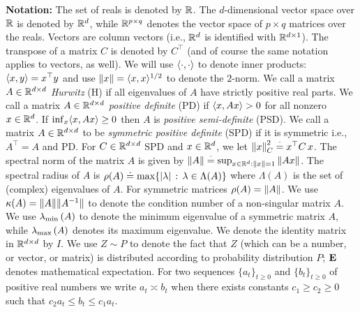 \textbf{Notation:} The set of reals is denoted by $\mathbb{R}$. 
The $d$-dimensional vector space over $\mathbb{R}$ is denoted by $\mathbb{R}^{d}$,
while $\mathbb{R}^{p\times q}$ denotes the vector space of $p\times q$ matrices over the reals.
Vectors are column vectors (i.e., $\mathbb{R}^d$ is identified with $\mathbb{R}^{d\times 1}$).
The transpose of a matrix $C$ is denoted by $C^\top$
(and of course the same notation applies to vectors, as well). 
We will use $\langle\cdot,\cdot\rangle$ to denote inner products: $\langle x,y\rangle=x^\top y$
and use $\left\| x\right\| = \langle x,x\rangle^{1/2}$ to denote the $2$-norm.
We call a matrix $A\in \mathbb{R}^{d \times d}$  \emph{Hurwitz} (H) if all eigenvalues of $A$ have strictly positive real parts. 
We call a matrix $A\in \mathbb{R}^{d \times d}$ \emph{positive definite} (PD) if $\langle x,Ax\rangle >0$ for all nonzero $x \in \mathbb{R}^{d}$.
If $\inf_x \langle x,Ax\rangle\ge 0$ then $A$ is \emph{positive semi-definite} (PSD).
We call a matrix $A\in \mathbb{R}^{d \times d}$ to be \emph{symmetric positive definite} (SPD) if 
it is symmetric i.e., $A^\top=A$ and PD. 
For $C\in \mathbb{R}^{d \times d}$ SPD and $x\in \mathbb{R}^d$, we let $\left\| x\right\|^2_C\stackrel{\cdot}{=} x^\top C \,x$.
The spectral norm of the matrix $A$ is given by $\left\| A\right\|\stackrel{\cdot}{=} \sup_{x\in \mathbb{R}^d:\left\| x\right\|=1} \left\| Ax\right\|$.  
The spectral radius of $A$ is $\rho(A)\doteq \max\{ |\lambda|\,:\, \lambda \in \Lambda(A) \}$ where $\Lambda(A)$ is the set of (complex) eigenvalues of $A$. For symmetric matrices $\rho(A) = \left\| A\right\|$.
We use $\kappa(A)=\| A\|\| A^{-1}\|$ to denote the condition number of a non-singular matrix $A$. 
We use $\lambda_{\min}\left(A\right)$ to denote the minimum eigenvalue of a symmetric matrix $A$, while $\lambda_{\max}\left(A\right)$ denotes its maximum eigenvalue.
We denote the identity matrix in $\mathbb{R}^{d \times d}$ by $I$. 
We use $Z\sim P$ to denote the fact that $Z$ (which can be a number, or vector, or matrix) is distributed according to probability distribution $P$; $\mathbf{E}$ denotes mathematical expectation. For two sequences $\{a_t\}_{t\geq 0}$ and $\{b_t\}_{t\geq 0}$ of positive real numbers we write $a_t\asymp b_t$ when there exists constants $c_1\geq c_2\geq 0$ such that $c_2 a_t\leq b_t\leq c_1 a_t$. 
